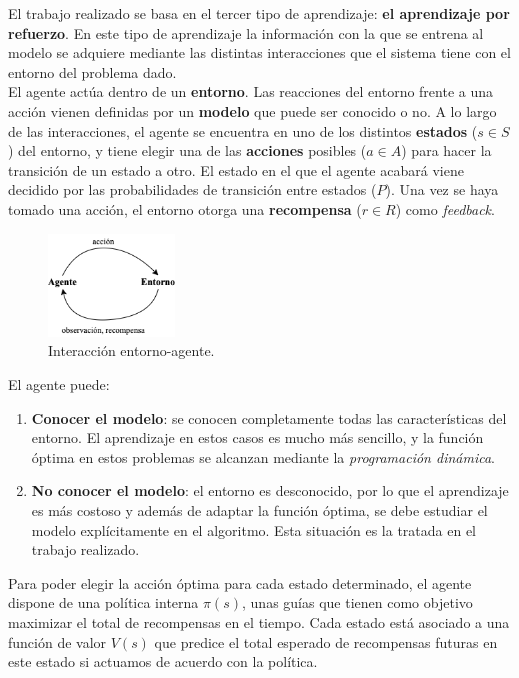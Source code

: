 \cite{lilLogRL}

El trabajo realizado se basa en el tercer tipo de aprendizaje: \textbf{el aprendizaje por refuerzo}. En este tipo de aprendizaje la información con la que se entrena al modelo se adquiere mediante las distintas interacciones que el sistema tiene con el entorno del problema dado. \\

El agente actúa dentro de un \textbf{entorno}. Las reacciones del entorno frente a una acción vienen definidas por un \textbf{modelo} que puede ser conocido o no. A lo largo de las interacciones, el agente se encuentra en uno de los distintos \textbf{estados} ($s \in S$) del entorno, y tiene elegir una de las \textbf{acciones} posibles ($a \in A$) para hacer la transición de un estado a otro. El estado en el que el agente acabará viene decidido por las probabilidades de transición entre estados ($P$). Una vez se haya tomado una acción, el entorno otorga una \textbf{recompensa} ($r \in R$) como \textit{feedback}. \\

\begin{figure}[h]
    \centering
    \includegraphics[width=0.3\textwidth]{cap2_contextualizacion/images/gym_ML.png}
    \caption{Interacción entorno-agente.}
    \label{fig:gym_ML}
\end{figure}

 El agente puede: 
 \begin{enumerate}
     \item \textbf{Conocer el modelo}: se conocen completamente todas las características del entorno. El aprendizaje en estos casos es mucho más sencillo, y la función óptima en estos problemas se alcanzan mediante la \textit{programación dinámica}. 
     \item \textbf{No conocer el modelo}: el entorno es desconocido, por lo que el aprendizaje es más costoso y además de adaptar la función óptima, se debe estudiar el modelo explícitamente en el algoritmo. Esta situación es la tratada en el trabajo realizado. 
 \end{enumerate}

Para poder elegir la acción óptima para cada estado determinado, el agente dispone de una política interna $\pi(s)$, unas guías que tienen como objetivo maximizar el total de recompensas en el tiempo. Cada estado está asociado a una función de valor $V(s)$ que predice el total esperado de recompensas futuras en este estado si actuamos de acuerdo con la política. \\


